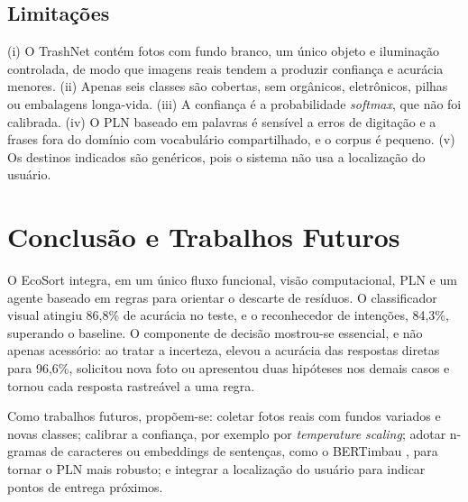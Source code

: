 \documentclass[conference]{IEEEtran}
\begin{document}
\subsection{Limitações}
(i) O TrashNet contém fotos com fundo branco, um único objeto e iluminação controlada, de modo que imagens reais tendem a produzir confiança e acurácia menores. (ii) Apenas seis classes são cobertas, sem orgânicos, eletrônicos, pilhas ou embalagens longa-vida. (iii) A confiança é a probabilidade \emph{softmax}, que não foi calibrada. (iv) O PLN baseado em palavras é sensível a erros de digitação e a frases fora do domínio com vocabulário compartilhado, e o corpus é pequeno. (v) Os destinos indicados são genéricos, pois o sistema não usa a localização do usuário.

\section{Conclusão e Trabalhos Futuros}
O EcoSort integra, em um único fluxo funcional, visão computacional, PLN e um agente baseado em regras para orientar o descarte de resíduos. O classificador visual atingiu 86,8\% de acurácia no teste, e o reconhecedor de intenções, 84,3\%, superando o baseline. O componente de decisão mostrou-se essencial, e não apenas acessório: ao tratar a incerteza, elevou a acurácia das respostas diretas para 96,6\%, solicitou nova foto ou apresentou duas hipóteses nos demais casos e tornou cada resposta rastreável a uma regra.

Como trabalhos futuros, propõem-se: coletar fotos reais com fundos variados e novas classes; calibrar a confiança, por exemplo por \emph{temperature scaling}; adotar n-gramas de caracteres ou embeddings de sentenças, como o BERTimbau \cite{bertimbau}, para tornar o PLN mais robusto; e integrar a localização do usuário para indicar pontos de entrega próximos.
\end{document}

